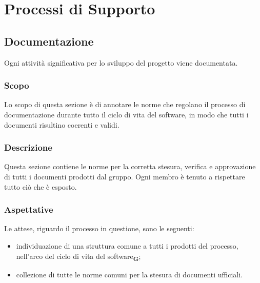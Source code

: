 \section{Processi di Supporto}
    \subsection{Documentazione}
    Ogni attività significativa per lo sviluppo del progetto viene documentata.
        \subsubsection{Scopo}
        Lo scopo di questa sezione è di annotare le norme che regolano il processo di documentazione durante tutto il ciclo di vita del software, in modo che tutti i documenti risultino coerenti e validi.
        \subsubsection{Descrizione}
        Questa sezione contiene le norme per la corretta stesura, verifica e approvazione di tutti i documenti prodotti dal gruppo. Ogni membro è tenuto a rispettare tutto ciò che è esposto.
        \subsubsection{Aspettative}
        Le attese, riguardo il processo in questione, sono le seguenti:
        \begin{itemize}
            \item individuazione di una struttura comune a tutti i prodotti del processo, nell’arco del ciclo di vita del software\textsubscript{\textbf{G}};
            \item collezione di tutte le norme comuni per la stesura di documenti ufficiali.
        \end{itemize}
